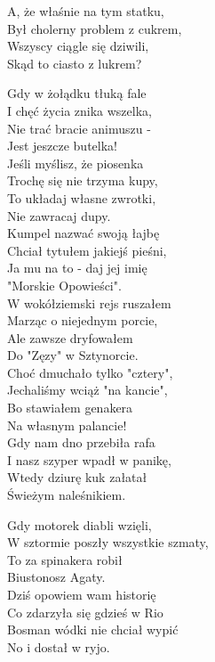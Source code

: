 \begin{multicols}{2}
A, że właśnie na tym statku, \\
Był cholerny problem z cukrem, \\
Wszyscy ciągle się dziwili, \\
Skąd to ciasto z lukrem?\\
\newcolumn

Gdy w żołądku tłuką fale\\
I chęć życia znika wszelka, \\
Nie trać bracie animuszu -\\
Jest jeszcze butelka!\\

Jeśli myślisz, że piosenka\\
Trochę się nie trzyma kupy, \\
To układaj własne zwrotki, \\
Nie zawracaj dupy.\\

Kumpel nazwać swoją łajbę\\
Chciał tytułem jakiejś pieśni, \\
Ja mu na to - daj jej imię\\
"Morskie Opowieści". \\

W wokółziemski rejs ruszałem\\
Marząc o niejednym porcie, \\
Ale zawsze dryfowałem\\
Do "Zęzy" w Sztynorcie.\\

Choć dmuchało tylko "cztery", \\
Jechaliśmy wciąż "na kancie", \\
Bo stawiałem genakera\\
Na własnym palancie!\\

Gdy nam dno przebiła rafa\\
I nasz szyper wpadł w panikę, \\
Wtedy dziurę kuk załatał\\
Świeżym naleśnikiem.\\
\newcolumn

Gdy motorek diabli wzięli, \\
W sztormie poszły wszystkie szmaty, \\
To za spinakera robił\\
Biustonosz Agaty.\\

Dziś opowiem wam historię\\
Co zdarzyła się gdzieś w Rio\\
Bosman wódki nie chciał wypić\\
No i dostał w ryjo.\\


\end{multicols}
